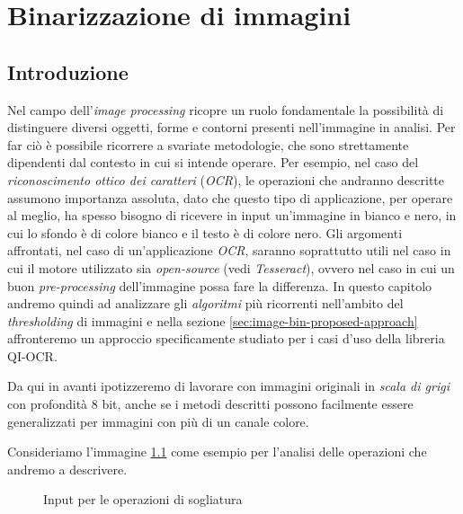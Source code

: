 \chapter{Binarizzazione di immagini}
\label{chap:image-binarization}


\section{Introduzione}
\label{sec:image-bin-intro}
Nel campo dell'\textit{image processing} ricopre un ruolo fondamentale la possibilit\`a di distinguere diversi oggetti, forme e contorni presenti nell'immagine in analisi. Per far ci\`o \`e possibile ricorrere a svariate metodologie, che sono strettamente dipendenti dal contesto in cui si intende operare. Per esempio, nel caso del \textit{riconoscimento ottico dei caratteri} (\textit{OCR}), le operazioni che andranno descritte assumono importanza assoluta, dato che questo tipo di applicazione, per operare al meglio, ha spesso bisogno di ricevere in input un'immagine in bianco e nero, in cui lo sfondo \`e di colore bianco e il testo \`e di colore nero. Gli argomenti affrontati, nel caso di un'applicazione \textit{OCR}, saranno soprattutto utili nel caso in cui il motore utilizzato sia \textit{open-source} (vedi \textit{Tesseract}), ovvero nel caso in cui un buon \textit{pre-processing} dell'immagine possa fare la differenza. In questo capitolo andremo quindi ad analizzare gli \textit{algoritmi} pi\`u ricorrenti nell'ambito del \textit{thresholding} di immagini e nella sezione \ref{sec:image-bin-proposed-approach} affronteremo un approccio specificamente studiato per i casi d'uso della libreria QI-OCR.\par
Da qui in avanti ipotizzeremo di lavorare con immagini originali in \textit{scala di grigi} con profondit\`a 8 bit, anche se i metodi descritti possono facilmente essere generalizzati per immagini con pi\`u di un canale colore.\par
Consideriamo l'immagine \ref{fig:image-bin-input} come esempio per l'analisi delle operazioni che andremo a descrivere.
\begin{figure}[h]
	\centering
	\caption{Input per le operazioni di sogliatura}
	\label{fig:image-bin-input}
\end{figure}


